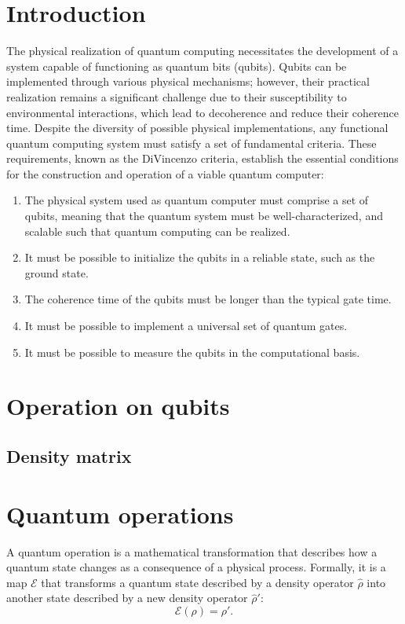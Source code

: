 \section{Introduction}
The physical realization of quantum computing necessitates the development of a system capable of functioning as quantum bits (qubits). 
Qubits can be implemented through various physical mechanisms; however, their practical realization remains a significant challenge due to their susceptibility to environmental interactions, which lead to decoherence and reduce their coherence time. 
Despite the diversity of possible physical implementations, any functional quantum computing system must satisfy a set of fundamental criteria. 
These requirements, known as the DiVincenzo criteria, establish the essential conditions for the construction and operation of a viable quantum computer\cite{DiVincenzo_2000,Manenti:2023zzn}:
\begin{enumerate}
    \item The physical system used as quantum computer must comprise a set of qubits, meaning that the quantum system must be well-characterized, and scalable such that quantum
    computing can be realized.
    \item It must be possible to initialize the qubits in a reliable state, such as the ground state.
    \item The coherence time of the qubits must be longer than the typical gate time.
    \item It must be possible to implement a universal set of quantum gates.
    \item It must be possible to measure the qubits in the computational basis.
\end{enumerate}


\section{Operation on qubits}

\subsection{Density matrix}
\section{Quantum operations}
A quantum operation is a mathematical transformation that describes how a quantum state changes as a consequence of a physical process. Formally, it is a map $\mathcal{E}$ that transforms a quantum state described by a density operator $\hat{\rho}$ into another state described by a new density operator $\hat{\rho}'$:
\begin{equation}
    \mathcal{E}(\rho) = \rho'\label{eq:quantum_map}.
\end{equation}

